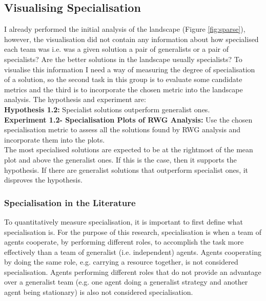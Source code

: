 \documentclass[12pt]{article}
\begin{document}
\subsection{Visualising Specialisation}

I already performed the initial analysis of the landscape (Figure \ref{fig:sparse}), however, the visualisation did not contain any information about how specialised each team was i.e. was a given solution a pair of generalists or a pair of specialists? 
Are the better solutions in the landscape usually specialists? 
To visualise this information I need a way of measuring the degree of specialisation of a solution, so the second task in this group is to evaluate some candidate metrics and the third is to incorporate the chosen metric into the landscape analysis.
The hypothesis and experiment are:\\

\textbf{Hypothesis 1.2:} Specialist solutions outperform generalist ones.\\

\textbf{Experiment 1.2- Specialisation Plots of RWG Analysis:}  Use the chosen specialisation metric to assess all the solutions found by RWG analysis and incorporate them into the plots.\\

The most specialised solutions are expected to be at the rightmost of the mean plot and above the generalist ones.
If this is the case, then it supports the hypothesis.
If there are generalist solutions that outperform specialist ones, it disproves the hypothesis.

\subsubsection{Specialisation in the Literature}

To quantitatively measure specialisation, it is important to first define what specialisation is.
For the purpose of this research, specialisation is when a team of agents cooperate, by performing different roles, to accomplish the task more effectively than a team of generalist (i.e. independent) agents.
Agents cooperating by doing the same role, e.g. carrying a resource together, is not considered specialisation.
Agents performing different roles that do not provide an advantage over a generalist team (e.g. one agent doing a generalist strategy and another agent being stationary) is also not considered specialisation.\\
\end{document}
